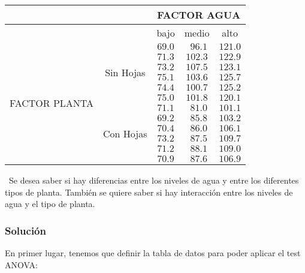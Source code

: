 \documentclass[
]{article}
\begin{document}
\begin{center}
\begin{tabular}{c|c|c|c|c|}
&&\multicolumn{3}{c|}{FACTOR AGUA}\\\hline
& &{bajo}&{medio}&{alto}\\\cline{3-5}
\multirow{12}{1.75cm}{FACTOR PLANTA}&\multirow{6}{1cm}{Sin Hojas}&
$69.0$&$\ \,96.1$&$121.0$\\\cline{3-5}
&&$71.3$&$102.3$&$122.9$\\\cline{3-5}
&&$73.2$&$107.5$&$123.1$\\\cline{3-5}
&&$75.1$&$103.6$&$125.7$\\\cline{3-5}
&&$74.4$&$100.7$&$125.2$\\\cline{3-5}
&&$75.0$&$101.8$&$120.1$\\\cline{2-5}
&\multirow{6}{1cm}{Con Hojas}&$71.1$&$\ \,81.0$&$101.1$\\\cline{3-5}
&&$69.2$&$\ \,85.8$&$103.2$\\\cline{3-5}
&&$70.4$&$\ \,86.0$&$106.1$\\\cline{3-5}
&&$73.2$&$\ \,87.5$&$109.7$\\\cline{3-5}
&&$71.2$&$\ \,88.1$&$109.0$\\\cline{3-5}
&&$70.9$&$\ \,87.6$&$106.9$\\\hline
\end{tabular}
\end{center}

~\newline Se desea saber si hay diferencias entre los niveles de agua y
entre los diferentes tipos de planta. También se quiere saber si hay
interacción entre los niveles de agua y el tipo de planta.

\hypertarget{soluciuxf3n-2}{%
\subsubsection{Solución}\label{soluciuxf3n-2}}

En primer lugar, tenemos que definir la tabla de datos para poder
aplicar el test ANOVA:
\end{document}
